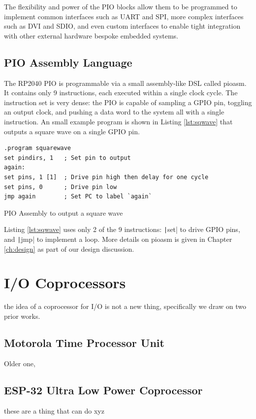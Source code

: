 The flexibility and power of the PIO blocks allow them to be programmed to implement common interfaces such as UART and SPI, more complex interfaces such as DVI and SDIO, and even custom interfaces to enable tight integration with other external hardware bespoke embedded systems.

\subsection{PIO Assembly Language}
The RP2040 PIO is programmable via a small assembly-like DSL called pioasm. It contains only 9 instructions, each executed within a single clock cycle. The instruction set is very dense: the PIO is capable of sampling a GPIO pin, toggling an output clock, and pushing a data word to the system all with a single instruction. An small example program is shown in Listing \ref{lst:sqwave} that outputs a square wave on a single GPIO pin.

\begin{listing}[b]
    \vspace{0.5cm}
    \begin{verbatim}
.program squarewave
set pindirs, 1   ; Set pin to output
again:
set pins, 1 [1]  ; Drive pin high then delay for one cycle
set pins, 0      ; Drive pin low
jmp again        ; Set PC to label `again`
    \end{verbatim}
    \caption{PIO Assembly to output a square wave \citep{rp2040}}
    \label{lst:sqwave}
\end{listing}

Listing \ref{lst:sqwave} uses only 2 of the 9 instructions: \texttt|set| to drive GPIO pins, and \texttt|jmp| to implement a loop. More details on pioasm is given in Chapter \ref{ch:design} as part of our design discussion.

\section{I/O Coprocessors}
the idea of a coprocessor for I/O is not a new thing, specifically we draw on two prior works.
\subsection{Motorola Time Processor Unit}
Older one,
\subsection{ESP-32 Ultra Low Power Coprocessor}
these are a thing that can do xyz
